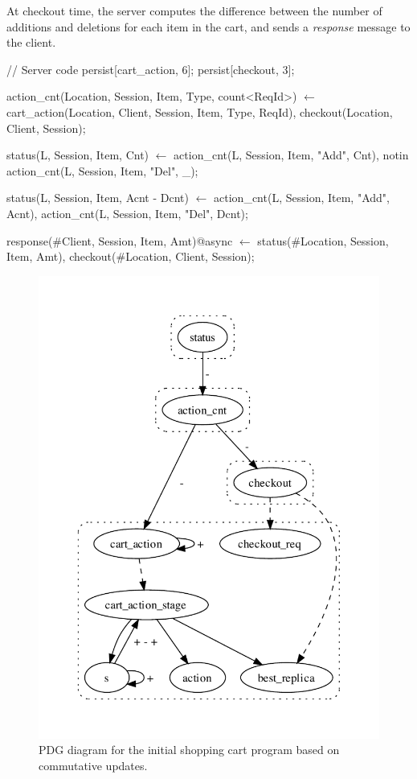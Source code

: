 At checkout time, the server computes the difference between the number of
additions and deletions for each item in the cart, and sends a {\em response}
message to the client.

\begin{Dedalus}
// Server code
persist[cart_action, 6];
persist[checkout, 3];

action_cnt(Location, Session, Item,
           Type, count<ReqId>) \(\leftarrow\)
    cart_action(Location, Client, Session,
                Item, Type, ReqId),
    checkout(Location, Client, Session);

status(L, Session, Item, Cnt) \(\leftarrow\)
    action_cnt(L, Session, Item, "Add", Cnt),
    notin action_cnt(L, Session, Item, "Del", _);

status(L, Session, Item, Acnt - Dcnt) \(\leftarrow\)
    action_cnt(L, Session, Item, "Add", Acnt),
    action_cnt(L, Session, Item, "Del", Dcnt);

response(#Client, Session, Item, Amt)@async \(\leftarrow\)
    status(#Location, Session, Item, Amt),
    checkout(#Location, Client, Session);
\end{Dedalus}

\begin{figure}[t]
\centering
\includegraphics[width=0.9\linewidth]{vizza_brick.pdf}
\caption{PDG diagram for the initial shopping cart program based on commutative updates.}
\label{fig:cs-pgd-1}
\end{figure}


